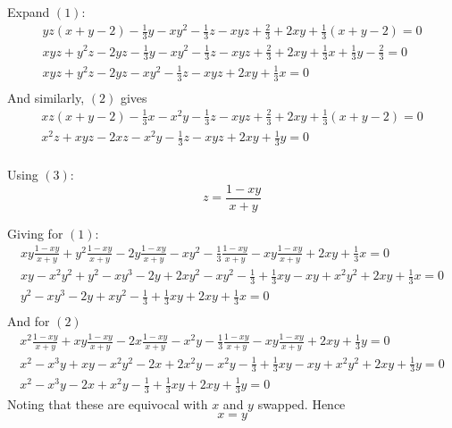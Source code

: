 \documentclass{X:/Documents/Coding/Latex/myassignment}
\begin{document}
\begin{enumerate}
	Expand $(1)$:
	\begin{align*}
		yz(x+y-2) - \frac13 y - xy^2 - \frac13 z - xyz + \frac23 + 2xy + \frac13(x+y-2) = 0\\
		xyz + y^2z - 2yz - \frac13 y - xy^2 - \frac13 z - xyz + \frac23 + 2xy + \frac13 x+\frac13 y-\frac23 = 0\\
		xyz + y^2z - 2yz  - xy^2 - \frac13 z - xyz  + 2xy + \frac13 x = 0\\
	\end{align*}
	And similarly, $(2)$ gives
	\begin{align*}
	xz(x+y-2) - \frac13x - x^2y - \frac13z - xyz +\frac23 + 2xy + \frac13(x+y-2) = 0\\
		x^2z + xyz - 2xz  - x^2 y - \frac13 z - xyz + 2xy +\frac13 y =0\\
	\end{align*}

	Using $(3)$:
	\[z = \frac{1- xy}{x+y}\]

	Giving for $(1)$:
	\begin{align*}		
		xy\frac{1- xy}{x+y} + y^2\frac{1- xy}{x+y} - 2y\frac{1- xy}{x+y}  - xy^2 - \frac13 \frac{1- xy}{x+y} - xy\frac{1- xy}{x+y}  + 2xy + \frac13 x = 0\\
		xy - x^2y^2 + y^2 - xy^3 - 2y + 2xy^2 - xy^2 - \frac13 + \frac13 xy - xy + x^2y^2 + 2xy + \frac13 x =0\\
		y^2 - xy^3 - 2y + xy^2 - \frac13 + \frac13 xy  + 2xy + \frac13 x =0\\
	\end{align*}
	And for $(2)$
	\begin{align*}
		x^2\frac{1- xy}{x+y} + xy\frac{1- xy}{x+y} - 2x\frac{1- xy}{x+y} - x^2 y - \frac13 \frac{1- xy}{x+y} - xy\frac{1- xy}{x+y} + 2xy +\frac13 y =0\\
		x^2 - x^3y + xy - x^2y^2 -2x + 2x^2y - x^2y - \frac13 + \frac13 xy - xy + x^2y^2 + 2xy + \frac13 y =0\\
		x^2 - x^3y - 2x + x^2y - \frac13 + \frac13 xy + 2xy + \frac13 y = 0
	\end{align*}
	Noting that these are equivocal with $x$ and $y$ swapped. Hence
	\[x = y\]


\end{enumerate}
\end{document}
